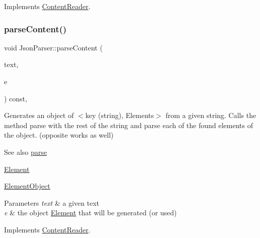 Implements \mbox{\hyperlink{classContentReader_a91fdd738983dcc7a246c3c163007dfa9}{Content\+Reader}}.

\mbox{\label{classJsonParser_a7d4fad0f0947a74ca158dc1922c97355}} 
\subsubsection{\texorpdfstring{parse\+Content()}{parseContent()}\hspace{0.1cm}{\footnotesize\ttfamily [5/6]}}
{\footnotesize\ttfamily void Json\+Parser\+::parse\+Content (\begin{DoxyParamCaption}\item[{std\+::string \&}]{text,  }\item[{\mbox{\hyperlink{classElementObject}{Element\+Object}} $\ast$}]{e }\end{DoxyParamCaption}) const\hspace{0.3cm}{\ttfamily [override]}, {\ttfamily [virtual]}}

Generates an object of $<$key (string), Elements$>$ from a given string. Calls the method parse with the rest of the string and parse each of the found elements of the object. (opposite works as well) \begin{DoxySeeAlso}{See also}
\mbox{\hyperlink{classJsonParser_a3ec3a9fcc8a63f987b4749d60b0568df}{parse}} 

\mbox{\hyperlink{classElement}{Element}} 

\mbox{\hyperlink{classElementObject}{Element\+Object}}
\end{DoxySeeAlso}

\begin{DoxyParams}{Parameters}
{\em text} & a given text \\
\hline
{\em e} & the object \mbox{\hyperlink{classElement}{Element}} that will be generated (or used) \\
\hline
\end{DoxyParams}


Implements \mbox{\hyperlink{classContentReader_a59a8de2bf3436e46b4d029a9b3c3c9da}{Content\+Reader}}.

\mbox{\label{classJsonParser_a07a4f2b10547d5f2251bc1f7b09d02c1}} 
